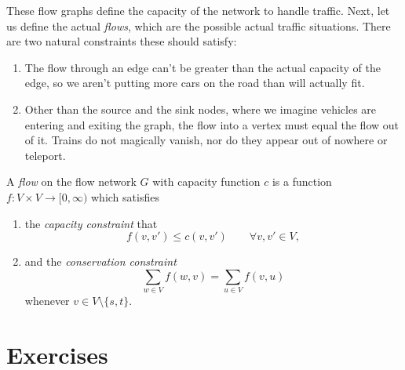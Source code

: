 \documentclass[nobib]{tufte-handout}
\begin{document}
  These flow graphs define the capacity of the network to handle traffic. Next, let us define the actual \emph{flows}, which are the possible actual traffic situations. There are two natural constraints these should satisfy:
  \begin{enumerate}
    \item The flow through an edge can't be greater than the actual capacity of the edge, so we aren't putting more cars on the road than will actually fit.
    \item Other than the source and the sink nodes, where we imagine vehicles are entering and exiting the graph, the flow into a vertex must equal the flow out of it. Trains do not magically vanish, nor do they appear out of nowhere or teleport.
  \end{enumerate}

  \begin{definition}
    A \emph{flow} on the flow network $G$ with capacity function $c$ is a function $f: V \times V \to [0,\infty)$ which satisfies
    \begin{enumerate}
        \item the \emph{capacity constraint} that
        $$f(v, v') \leq c(v, v')\qquad \forall v, v' \in V,$$
        \item and the \emph{conservation constraint}
        $$\sum_{w \in V} f(w, v) = \sum_{u \in V} f(v, u)$$
        whenever $v \in V \setminus \{s,t\}$.
    \end{enumerate}
  \end{definition}




\section{Exercises}

%
%
\end{document}
